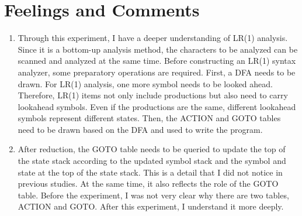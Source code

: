 \documentclass[a4paper,12pt]{article}
\begin{document}
\section{Feelings and Comments}
\begin{enumerate}
    \item Through this experiment, I have a deeper understanding of LR(1) analysis. Since it is a bottom-up analysis method, the characters to be analyzed can be scanned and analyzed at the same time. Before constructing an LR(1) syntax analyzer, some preparatory operations are required. First, a DFA needs to be drawn. For LR(1) analysis, one more symbol needs to be looked ahead. Therefore, LR(1) items not only include productions but also need to carry lookahead symbols. Even if the productions are the same, different lookahead symbols represent different states. Then, the ACTION and GOTO tables need to be drawn based on the DFA and used to write the program.
    \item After reduction, the GOTO table needs to be queried to update the top of the state stack according to the updated symbol stack and the symbol and state at the top of the state stack. This is a detail that I did not notice in previous studies. At the same time, it also reflects the role of the GOTO table. Before the experiment, I was not very clear why there are two tables, ACTION and GOTO. After this experiment, I understand it more deeply.
\end{enumerate}
\end{document}
